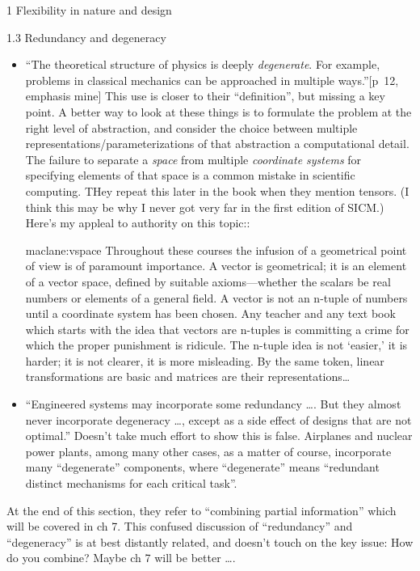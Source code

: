 \documentclass[11pt]{PalisadesLakesBook}
\begin{document}
\begin{plSection}{}
\begin{plSection}{1 Flexibility in nature and design}
\begin{plSection}{1.3 Redundancy and degeneracy}
\begin{itemize}
  \item ``The theoretical structure of physics is deeply 
\emph{degenerate}.
For example, problems in classical mechanics can be approached
in multiple ways.''[p~12, emphasis mine]
This use is closer to their ``definition'',
but missing a key point. 
A better way to look at these things is to formulate 
the problem at the right level of abstraction,
and consider the choice between 
multiple representations/parameterizations of that abstraction
a computational detail.
The failure to separate a \emph{space} 
from multiple \emph{coordinate systems} for specifying
elements of that space is a common mistake 
in scientific computing.
THey repeat this later in the book when they mention tensors.
(I think this may be why I never got very far 
in the first edition of SICM.)
Here's my appleal to authority on this topic::
\begin{plQuote}
{}
{maclane:vspace}
Throughout these courses the infusion of a geometrical
point of view is of paramount importance. A vector
is geometrical; it is an element of a vector space, defined
by suitable axioms—whether the scalars be real numbers or
elements of a general field. A vector is not an n-tuple of
numbers until a coordinate system has been chosen. Any
teacher and any text book which starts with the idea that vectors
are n-tuples is committing a crime for which the proper
punishment is ridicule. The n-tuple idea is not ‘easier,’ it is
harder; it is not clearer, it is more misleading. By the same
token, linear transformations are basic and matrices are their
representations\ldots
\end{plQuote}

\item ``Engineered systems may incorporate some redundancy 
{\ldots}.
But they almost never incorporate degeneracy {\ldots},
except as a side effect of designs that are not optimal.''
Doesn't take much effort to show this is false.
Airplanes and nuclear power plants, among many other cases,
as a matter of course, incorporate many ``degenerate'' components,
where ``degenerate'' means 
``redundant distinct mechanisms for each critical task''.

\end{itemize}

At the end of this section, they refer to 
``combining partial information'' which will be covered in ch 7.
This confused discussion of ``redundancy'' and ``degeneracy''
is at best distantly related, and doesn't touch 
on the key issue: How do you combine?
Maybe ch 7 will be better {\ldots}.


\end{plSection}
\end{plSection}
\end{plSection}
\end{document}
